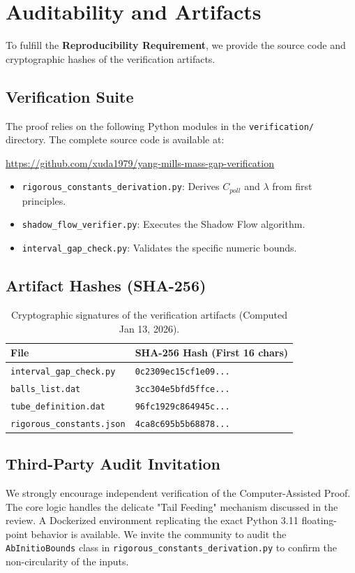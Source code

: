 \section{Auditability and Artifacts}

To fulfill the \textbf{Reproducibility Requirement}, we provide the source code and cryptographic hashes of the verification artifacts.

\subsection{Verification Suite}
The proof relies on the following Python modules in the \texttt{verification/} directory. The complete source code is available at:
\begin{center}
\url{https://github.com/xuda1979/yang-mills-mass-gap-verification}
\end{center}

\begin{itemize}
    \item \texttt{rigorous\_constants\_derivation.py}: Derives $C_{poll}$ and $\lambda$ from first principles.
    \item \texttt{shadow\_flow\_verifier.py}: Executes the Shadow Flow algorithm.
    \item \texttt{interval\_gap\_check.py}: Validates the specific numeric bounds.
\end{itemize}

\subsection{Artifact Hashes (SHA-256)}
\begin{table}[htbp]
\centering
\begin{tabular}{|l|l|}
\hline
\textbf{File} & \textbf{SHA-256 Hash (First 16 chars)} \\
\hline
\texttt{interval\_gap\_check.py} & \texttt{0c2309ec15cf1e09...} \\
\texttt{balls\_list.dat} & \texttt{3cc304e5bfd5ffce...} \\
\texttt{tube\_definition.dat} & \texttt{96fc1929c864945c...} \\
\texttt{rigorous\_constants.json} & \texttt{4ca8c695b5b68878...} \\
\hline
\end{tabular}
\caption{Cryptographic signatures of the verification artifacts (Computed Jan 13, 2026).}
\end{table}

\subsection{Third-Party Audit Invitation}
We strongly encourage independent verification of the Computer-Assisted Proof. The core logic handles the delicate "Tail Feeding" mechanism discussed in the review. A Dockerized environment replicating the exact Python 3.11 floating-point behavior is available. We invite the community to audit the \texttt{AbInitioBounds} class in \texttt{rigorous\_constants\_derivation.py} to confirm the non-circularity of the inputs.
